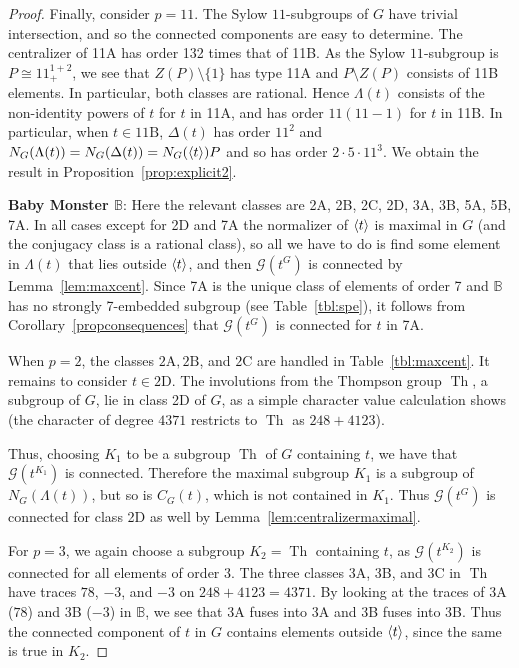 \documentclass[11pt,a4paper]{amsart}
\theoremstyle{plain}
\theoremstyle{definition}
\theoremstyle{remark}
\theoremstyle{remark}
\theoremstyle{remark}
\theoremstyle{definition}
\newcommand{\GG}{\mathcal{G}}
\newcommand{\BM}{\mathbb{B}}
\DeclareMathOperator{\Th}{Th}
\DeclarePairedDelimiter{\gen}{\langle}{\rangle}
\begin{document}
\begin{proof}
Finally, consider $p=11$. The Sylow $11$-subgroups of $G$ have trivial intersection, and so the connected components are easy to determine. The centralizer of 11A has order 132 times that of 11B. As the Sylow $11$-subgroup is $P\cong 11^{1+2}_+$, we see that $Z(P)\setminus\{1\}$ has type 11A and $P\setminus Z(P)$ consists of 11B elements. In particular, both classes are rational. Hence $\Lambda(t)$ consists of the non-identity powers of $t$ for $t$ in 11A, and has order $11(11-1)$ for $t$ in 11B. In particular, when $t\in \mathrm{11B}$, $\Delta(t)$ has order $11^2$ and $N_G(\Lambda(t))=N_G(\Delta(t)) = N_G(\gen{t})P$ and so has order $2\cdot 5\cdot 11^3$. We obtain the result in Proposition~\ref{prop:explicit2}.
\medskip

\textbf{Baby Monster $\BM$}: Here the relevant classes are 2A, 2B, 2C, 2D, 3A, 3B, 5A, 5B, 7A. In all cases except for 2D and 7A the normalizer of $\gen t$ is maximal in $G$ (and the conjugacy class is a rational class), so all we have to do is find some element in $\Lambda(t)$ that lies outside $\gen t$, and then $\GG(t^G)$ is connected by Lemma~\ref{lem:maxcent}. Since 7A is the unique class of elements of order 7 and $\BM$ has no strongly 7-embedded subgroup (see Table~\ref{tbl:spe}), it follows from Corollary~\ref{propconsequences} that $\GG(t^G)$ is connected for $t$ in 7A.

When $p=2$, the classes $\mathrm{2A},\mathrm{2B}$, and $\mathrm{2C}$ are handled in Table~\ref{tbl:maxcent}.
It remains to consider $t\in\mathrm{2D}$. The involutions from the Thompson group $\Th$, a subgroup of $G$, lie in class 2D of $G$, as a simple character value calculation shows (the character of degree $4371$ restricts to $\Th$ as $248+4123$).

Thus, choosing $K_1$ to be a subgroup $\Th$ of $G$ containing $t$, we have that $\GG(t^{K_1})$ is connected. Therefore the maximal subgroup $K_1$ is a subgroup of $N_G(\Lambda(t))$, but so is $C_G(t)$, which is not contained in $K_1$. Thus $\GG(t^G)$ is connected for class 2D as well by Lemma~\ref{lem:centralizermaximal}.

For $p=3$, we again choose a subgroup $K_2=\Th$ containing $t$, as $\GG(t^{K_2})$ is connected for all elements of order $3$. The three classes 3A, 3B, and 3C in $\Th$ have traces $78$, $-3$, and $-3$ on $248+4123=4371$. By looking at the traces of 3A ($78$) and 3B ($-3$) in $\BM$, we see that 3A fuses into 3A and 3B fuses into 3B. Thus the connected component of $t$ in $G$ contains elements outside $\gen t$, since the same is true in $K_2$.


\end{proof}
\end{document}
